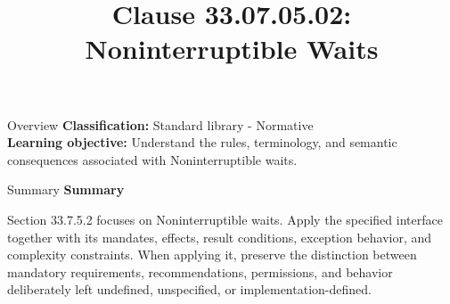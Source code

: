 \documentclass[10pt,letterpaper]{article}
\title{Clause 33.07.05.02: Noninterruptible Waits}
\author{}
\date{}
\begin{document}
\maketitle
\begin{CornellOverviewBox}{Overview}
\textbf{Classification:} Standard library - Normative\\[2pt]
\textbf{Learning objective:} Understand the rules, terminology, and semantic consequences associated with Noninterruptible waits.
\end{CornellOverviewBox}\begin{CornellSummaryBox}{Summary}
{\sffamily\bfseries\color{Accent} Summary}\par\vspace{3pt}Section 33.7.5.2 focuses on Noninterruptible waits. Apply the specified interface together with its mandates, effects, result conditions, exception behavior, and complexity constraints. When applying it, preserve the distinction between mandatory requirements, recommendations, permissions, and behavior deliberately left undefined, unspecified, or implementation-defined.
\end{CornellSummaryBox}
\end{document}
